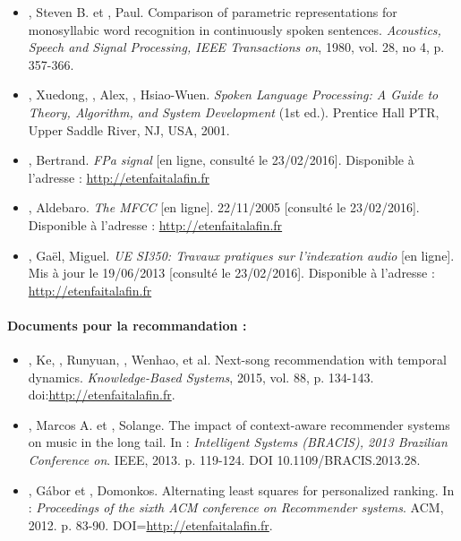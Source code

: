 \begin{itemize}
	\item[\textbullet] , Steven B. et , Paul. Comparison of parametric representations for monosyllabic word recognition in continuously spoken sentences. \textit{Acoustics, Speech and Signal Processing, IEEE Transactions on}, 1980, vol. 28, no 4, p. 357-366.
	\item[\textbullet] , Xuedong, , Alex, , Hsiao-Wuen. \textit{Spoken Language Processing: A Guide to Theory, Algorithm, and System Development} (1st ed.). Prentice Hall PTR, Upper Saddle River, NJ, USA, 2001.
	\item[\textbullet] , Bertrand. \textit{FPa signal} [en ligne, consulté le 23/02/2016]. Disponible à l'adresse :  \url{http://etenfaitalafin.fr}
	\item[\textbullet] , Aldebaro. \textit{The MFCC} [en ligne]. 22/11/2005 [consulté le 23/02/2016]. Disponible à l'adresse : \url {http://etenfaitalafin.fr}
	\item[\textbullet] , Gaël,  Miguel. \textit{UE SI350: Travaux pratiques sur l'indexation audio} [en ligne]. Mis à jour le 19/06/2013 [consulté le 23/02/2016]. Disponible à l'adresse : \url{http://etenfaitalafin.fr}
\end{itemize}


\paragraph{Documents pour la recommandation :}

\begin{itemize}
	\item[\textbullet] , Ke, , Runyuan, , Wenhao, et al. Next-song recommendation with temporal dynamics. \textit{Knowledge-Based Systems}, 2015, vol. 88, p. 134-143. doi:\url{http://etenfaitalafin.fr}.
	\item[\textbullet] , Marcos A. et , Solange. The impact of context-aware recommender systems on music in the long tail. In : \textit{Intelligent Systems (BRACIS), 2013 Brazilian Conference on}. IEEE, 2013. p. 119-124. DOI 10.1109/BRACIS.2013.28.
	\item[\textbullet] , Gábor et , Domonkos. Alternating least squares for personalized ranking. In : \textit{Proceedings of the sixth ACM conference on Recommender systems}. ACM, 2012. p. 83-90. DOI=\url{http://etenfaitalafin.fr}.
\end{itemize}


